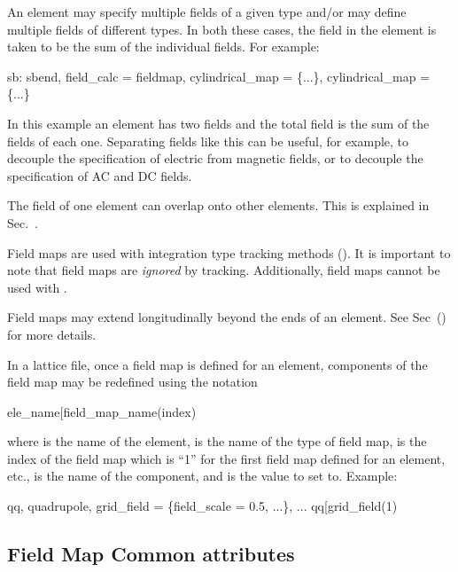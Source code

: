 An element may specify multiple fields of a given type and/or may define multiple fields
of different types. In both these cases, the field in the element is taken to be the sum
of the individual fields. For example:
\begin{example}
  sb: sbend, field_calc = fieldmap, cylindrical_map = \{...\},  cylindrical_map = \{...\}
\end{example}
In this example an element has two  fields and the total field is the
sum of the fields of each one. Separating fields like this can be useful, for example, to
decouple the specification of electric from magnetic fields, or to decouple the
specification of AC and DC fields.

The field of one element can overlap onto other elements. This is explained in
Sec.~.

Field maps are used with integration type tracking methods ().  It is important to
note that field maps are {\em ignored} by  tracking. Additionally, 
field maps cannot be used with .

Field maps may extend longitudinally beyond the ends of an element. See Sec~() for
more details.

In a lattice file, once a field map is defined for an element, components of the field map
may be redefined using the notation
\begin{example}
  ele_name[field_map_name(index)%
\end{example}
where  is the name of the element,  is the name of the
type of field map,  is the index of the field map which is ``1'' for the first
field map defined for an element, etc.,  is the name of the component,
and  is the value to set to. Example:
\begin{example}
  qq, quadrupole, grid_field = \{field_scale = 0.5, ...\}, ...
  qq[grid_field(1)%
\end{example}

\subsection{Field Map Common attributes}
\label{s:fieldmap.com}

